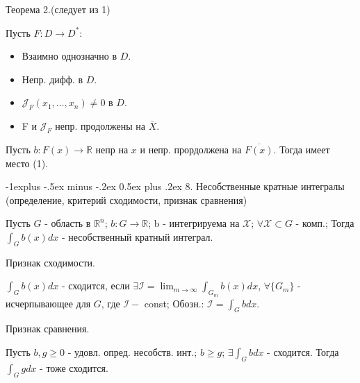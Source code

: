 \documentclass[unicode,10pt, landscape]{article}
\makeatletter
\renewcommand{\subsection}{\@startsection{subsection}{2}{0mm}%
                                {-1explus -.5ex minus -.2ex}%
                                {0.5ex plus .2ex}%
                                {\normalfont\normalsize\bfseries}}
\makeatother
\begin{document}
\begin{multicols}{2}
Теорема 2.(следует из 1)
\begin{Th}
Пусть $F: D \to D^*$: 
\begin{itemize}
\item Взаимно однозначно в $D$.
\item Непр. дифф. в $D$.
\item $\mathcal{J}_F (x_1, \ldots, x_n) \neq 0$ в $D$.
\item F и $\mathcal{J}_F$ непр. продолжены на $\overline{X}$.
\end{itemize}
Пусть $b: F(x) \to \mathbb{R}$ непр на $x$ и непр. прордолжена на $\overline{F(x)}$. Тогда имеет место (1).
\end{Th}


\subsection{8. Несобственные кратные интегралы (определение, критерий сходимости, признак сравнения)}
\begin{Def}
Пусть $G$ - область в $\mathbb{R}^n$; $b: G \to \mathbb{R}$; b - интегрируема на $\mathcal{X}$; $\forall \mathcal{X} \subset G$ - комп.; Тогда $\int_G b(x)dx$ - несобственный кратный интеграл.
\end{Def}
Признак сходимости.
\begin{Def}
$\int_G b(x)dx$ - сходится, если $\exists \mathcal{I} = \lim_{m \to \infty} \int_{G_m}b(x)dx$, $\forall\{ G_m \}$ - исчерпывающее для $G$, где $\mathcal{I} - $ const; Обозн.: $\mathcal{I} = \int_G bdx$.
\end{Def}
Признак сравнения.
\begin{Th}
Пусть $b, g \geq 0$ - удовл. опред. несобств. инт.; $b \geq g$; $\exists \int_G bdx$ - сходится. Тогда $\int_G gdx$ - тоже сходится.
\end{Th}



\end{multicols}
\end{document}
